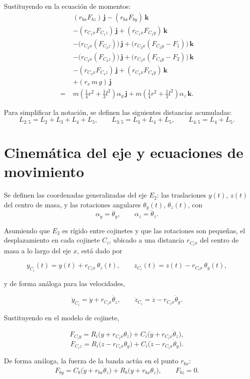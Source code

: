 Sustituyendo en la ecuación de momentos:
\begin{align*}
&(r_{bx}F_{bz})\,\mathbf j-(r_{bx}F_{by})\,\mathbf k\\
&-(r_{C_1x}F_{C_1z})\,\mathbf j+(r_{C_1x}F_{C_1y})\,\mathbf k\\
&-\big(r_{C_2x}(F_{C_2z})\big)\,\mathbf j+\big(r_{C_2x}(F_{C_2y}-F_1)\big)\,\mathbf k\\
&-\big(r_{C_3x}(F_{C_3z})\big)\,\mathbf j+\big(r_{C_3x}(F_{C_3y}-F_2)\big)\,\mathbf k\\
&-(r_{C_4x}F_{C_4z})\,\mathbf j+(r_{C_4x}F_{C_4y})\,\mathbf k\\
&+(r_x\,m\,g)\,\mathbf j\\
=\;&m\left(\frac14 r^2+\frac13 l^2\right)\alpha_y\,\mathbf j
+ m\left(\frac14 r^2+\frac13 l^2\right)\alpha_z\,\mathbf k.
\end{align*}

Para simplificar la notación, se definen las siguientes distancias acumuladas:
\[
L_{2:5}=L_2+L_3+L_4+L_5,\qquad
L_{3:5}=L_3+L_4+L_5,\qquad
L_{4:5}=L_4+L_5.
\]

\section{Cinemática del eje y ecuaciones de movimiento}

Se definen las coordenadas generalizadas del eje $E_2$: las traslaciones $y(t)$, $z(t)$ del centro de masa, y las rotaciones angulares $\theta_y(t)$, $\theta_z(t)$, con
\[
\alpha_y=\ddot\theta_y,\qquad \alpha_z=\ddot\theta_z.
\]

Asumiendo que $E_2$ es rígido entre cojinetes y que las rotaciones son pequeñas, el desplazamiento en cada cojinete $C_i$, ubicado a una distancia $r_{C_ix}$ del centro de masa a lo largo del eje $x$, está dado por

\[
y_{C_i}(t)=y(t)+r_{C_ix}\,\theta_z(t),\qquad
z_{C_i}(t)=z(t)-r_{C_ix}\,\theta_y(t),
\]

y de forma análoga para las velocidades,

\[
\dot y_{C_i}=\dot y+r_{C_ix}\dot\theta_z,\qquad
\dot z_{C_i}=\dot z-r_{C_ix}\dot\theta_y.
\]

Sustituyendo en el modelo de cojinete,

\[
F_{C_iy}=R_i\big(y+r_{C_ix}\theta_z\big)+C_i\big(\dot y+r_{C_ix}\dot\theta_z\big),
\]
\[
F_{C_iz}=R_i\big(z-r_{C_ix}\theta_y\big)+C_i\big(\dot z-r_{C_ix}\dot\theta_y\big).
\]

De forma análoga, la fuerza de la banda actúa en el punto $r_{bx}$:
\[
F_{by}=C_b\big(\dot y+r_{bx}\dot\theta_z\big)+R_b\big(y+r_{bx}\theta_z\big),
\qquad F_{bz}=0.
\]

